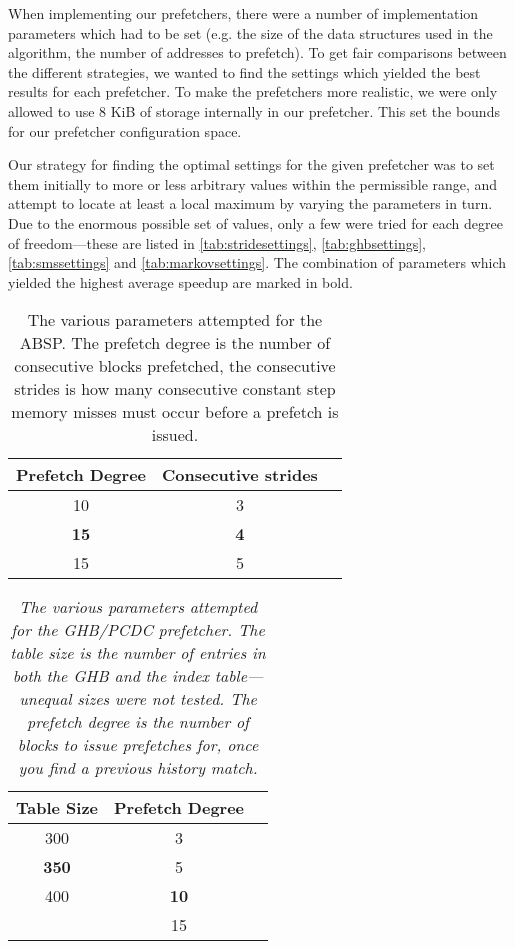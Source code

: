 When implementing our prefetchers, there were a number of
implementation parameters which had to be set (e.g. the size of the
data structures used in the algorithm, the number of addresses to
prefetch). To get fair comparisons between the different strategies,
we wanted to find the settings which yielded the best results for each
prefetcher. To make the prefetchers more realistic, we were only
allowed to use 8 KiB of storage internally in our prefetcher. This set
the bounds for our prefetcher configuration space. 

Our strategy for
finding the optimal settings for the given prefetcher was to set them
initially to more or less arbitrary values within the permissible
range, and attempt to locate at least a local maximum by
varying the parameters in turn. Due to the enormous possible set of
values, only a few were tried for each degree of freedom---these are
listed in \autoref{tab:stridesettings}, \autoref{tab:ghbsettings},
\autoref{tab:smssettings} and \autoref{tab:markovsettings}. The
combination of parameters which yielded the highest average speedup
are marked in bold.

\begin{table}[htbp]
  \centering
  \begin{tabular}{|c|c|c|}
    \hline
    \textbf{Prefetch Degree} & \textbf{Consecutive strides} \\ \hline
    10 & 3 \\ \hline
    \textbf{15} & \textbf{4} \\ \hline
    15 & 5 \\ \hline %
  \end{tabular}
  \label{tab:stridesettings}
  \caption{The various parameters attempted for the ABSP. The prefetch degree is the number of consecutive blocks prefetched, the consecutive strides is how many consecutive constant step memory misses must occur before a prefetch is issued.}
\end{table}

\begin{table}[htbp]
  \caption{\emph{The various parameters attempted for the GHB/PCDC prefetcher. The table size is the number of entries in both the GHB and the index table---unequal sizes were not tested. The prefetch degree is the number of blocks to issue prefetches for, once you find a previous history match.}}
  \centering
  \begin{tabular}{|c|c|c|}
    \hline
    \textbf{Table Size} & \textbf{Prefetch Degree} \\ \hline
    300 & 3 \\ \hline
    \textbf{350} & 5 \\ \hline
    400 & \textbf{10} \\ \hline
        & 15 \\ \hline
  \end{tabular}
  \label{tab:ghbsettings}
\end{table}

